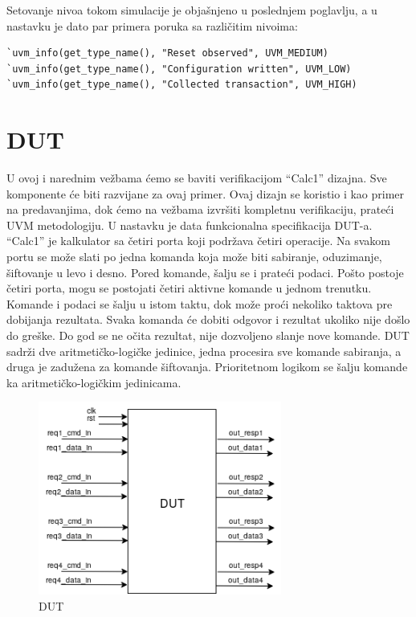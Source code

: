 Setovanje nivoa tokom simulacije je objašnjeno u poslednjem poglavlju, a u
nastavku je dato par primera poruka sa različitim nivoima:

\begin{lstlisting}
`uvm_info(get_type_name(), "Reset observed", UVM_MEDIUM)
`uvm_info(get_type_name(), "Configuration written", UVM_LOW)
`uvm_info(get_type_name(), "Collected transaction", UVM_HIGH)
\end{lstlisting}


\section{DUT}

U ovoj i narednim vežbama ćemo se baviti verifikacijom ``Calc1'' dizajna. Sve
komponente će biti razvijane za ovaj primer. Ovaj dizajn se koristio i kao
primer na predavanjima, dok ćemo na vežbama izvršiti kompletnu verifikaciju,
prateći UVM metodologiju. U nastavku je data funkcionalna specifikacija DUT-a.\\

``Calc1'' je kalkulator sa četiri porta koji podržava četiri operacije. Na
svakom portu se može slati po jedna komanda koja može biti sabiranje,
oduzimanje, šiftovanje u levo i desno. Pored komande, šalju se i prateći podaci.
Pošto postoje četiri porta, mogu se postojati četiri aktivne komande u jednom
trenutku. Komande i podaci se šalju u istom taktu, dok može proći nekoliko
taktova pre dobijanja rezultata. Svaka komanda će dobiti odgovor i rezultat
ukoliko nije došlo do greške. Do god se ne očita rezultat, nije dozvoljeno
slanje nove komande. DUT sadrži dve aritmetičko-logičke jedinice, jedna
procesira sve komande sabiranja, a druga je zadužena za komande šiftovanja.
Prioritetnom logikom se šalju komande ka aritmetičko-logičkim jedinicama.\\

\begin{figure}[h!]
  \centering
  \includegraphics[width=80mm]{img/v5_dut.png}
  \caption{DUT}
  \label{fig:dut}
\end{figure}

